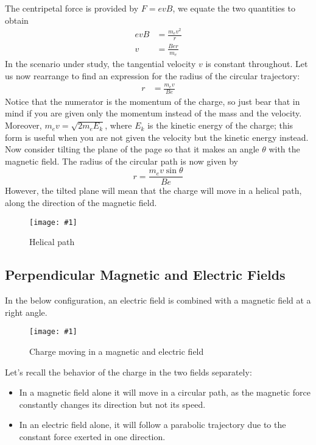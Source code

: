 \documentclass[a4paper,12pt]{article}
\newcommand{\lb}{\\[8pt]}
\newcommand{\img}[4]{\begin{center}
  \begin{figure}[H]
    \centering
    \texttt{[image: \#1]}
    \caption{#3}
    \label{fig:#4}
  \end{figure}
\end{center}}
\begin{document}
\pagebreak
The centripetal force is provided by $F = evB$, we equate the two quantities to obtain
\begin{align*}
  evB & = \frac{m_ev^2}{r} \\
  v   & = \frac{Ber}{m_e}
\end{align*}
In the scenario under study, the tangential velocity $v$ is constant throughout. Let us now rearrange to find an expression for the radius of the circular trajectory:
\begin{align*}
  r & = \frac{m_ev}{Be}
\end{align*}
Notice that the numerator is the momentum of the charge, so just bear that in mind if you are given only the momentum instead of the mass and the velocity. Moreover, $m_ev  = \sqrt{2m_eE_k}$, where $E_k$ is the kinetic energy of the charge; this form is useful when you are not given the velocity but the kinetic energy instead.\lb
Now consider tilting the plane of the page so that it makes an angle $\theta$ with the magnetic field. The radius of the circular path is now given by $$r = \dfrac{m_ev\sin\theta}{Be}$$
However, the tilted plane will mean that the charge will move in a helical path,  along the direction of the magnetic field.
\img{helicalpath.png}{0.4}{Helical path}{helicalpath}


\subsection{Perpendicular Magnetic and Electric Fields}
In the below configuration, an electric field is combined with a magnetic field at a right angle.

\img{move3.png}{0.6}{Charge moving in a magnetic and electric field}{move3}

Let's recall the behavior of the charge in the two fields separately:
\begin{itemize}
  \item In a magnetic field alone it will move in a circular path, as the magnetic force constantly changes its direction but not its speed.
  \item In an electric field alone, it will follow a parabolic trajectory due to the constant force exerted in one direction.
\end{itemize}
\end{document}
